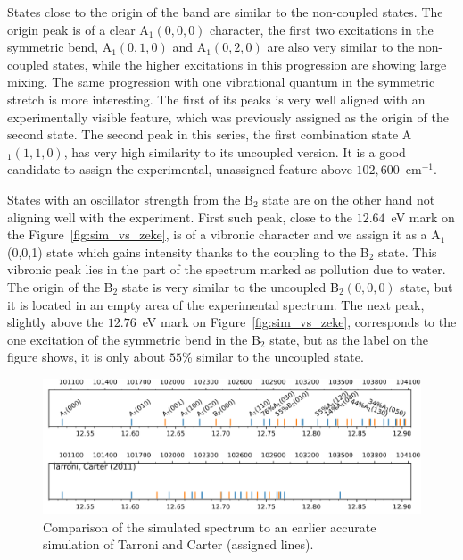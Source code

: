 \documentclass[12pt,pra,aps,superscriptaddress]{revtex4-2}
\begin{document}
States close to the origin of the band are similar to the non-coupled states.
The origin peak is of a clear A$_1(0,0,0)$ character, the first two
excitations in the symmetric bend, A$_1(0,1,0)$ and A$_1(0,2,0)$ are also very
similar to the non-coupled states, while the higher excitations in this
progression are showing large mixing. The same progression with one
vibrational quantum in the symmetric stretch is more interesting. The first of
its peaks is very well aligned with an experimentally visible feature, which
was previously assigned as the origin of the second state. The second peak in
this series, the first combination state A$_1(1,1,0)$, has very high
similarity to its uncoupled version. It is a good candidate to assign the
experimental, unassigned feature above $102,600$~cm$^{-1}$.

States with an oscillator strength from the B$_2$ state are on the other hand
not aligning well with the experiment. First such peak, close to the $12.64$~eV
mark on the Figure~\ref{fig:sim_vs_zeke}, is of a vibronic character and we
assign it as a A$_1$(0,0,1) state which gains intensity thanks to the coupling
to the B$_2$ state. This vibronic peak lies in the part of the spectrum marked
as pollution due to water. The origin of the B$_2$ state is very similar to
the uncoupled B$_2(0,0,0)$ state, but it is located in an empty area of the
experimental spectrum. The next peak, slightly above the $12.76$~eV mark on
Figure~\ref{fig:sim_vs_zeke}, corresponds to the one excitation of the symmetric
bend in the B$_2$ state, but as the label on the figure shows, it is only
about $55$\% similar to the uncoupled state.

\begin{figure}
    \includegraphics[width=16 cm]{figures/sim_vs_TarroniCarter}
    \caption{
        Comparison of the simulated spectrum to an earlier accurate simulation
        of Tarroni and Carter (assigned lines).~\cite{tarroni:O3:2011}
    }
    \label{fig:sim_vs_tarronicarter}
\end{figure}
\end{document}
